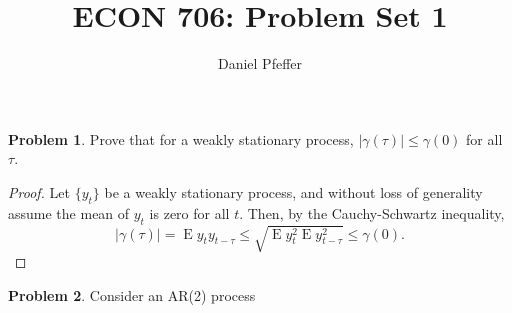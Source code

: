 \documentclass[oneside,reqno]{amsart}
\title{ECON 706: Problem Set 1}
\author{Daniel Pfeffer}
\DeclareMathOperator{\E}{E}
\theoremstyle{definition}
\newtheorem{prob}{Problem}
\begin{document}
\maketitle

\begin{prob}
Prove that for a weakly stationary process, $|\gamma(\tau)| \leq \gamma(0)$ for all $\tau$.
\end{prob}

\begin{proof}
Let $\{y_t\}$ be a weakly stationary process, and without loss of generality assume the mean of $y_t$ is zero for all $t$. Then, by the Cauchy-Schwartz inequality, 
\[
	| \gamma(\tau) | = \E y_t y_{t-\tau} \leq \sqrt{\E y_t^2 \E y_{t-\tau}^2} \leq \gamma(0).
\]
\end{proof}

\begin{prob}
Consider an AR(2) process
\end{prob}
\end{document}
